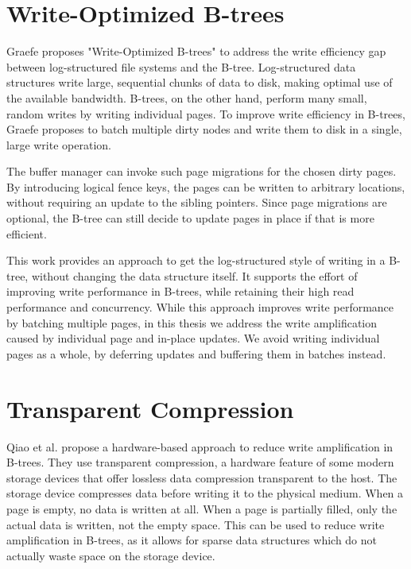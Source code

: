 \section{Write-Optimized B-trees}
Graefe proposes "Write-Optimized B-trees" \cite{graefe2004write} to address the write efficiency gap between log-structured file systems and the B-tree.
Log-structured data structures write large, sequential chunks of data to disk, making optimal use of the available bandwidth.
B-trees, on the other hand, perform many small, random writes by writing individual pages.
To improve write efficiency in B-trees, Graefe proposes to batch multiple dirty nodes and write them to disk in a single, large write operation.

The buffer manager can invoke such page migrations for the chosen dirty pages.
By introducing logical fence keys, the pages can be written to arbitrary locations, without requiring an update to the sibling pointers.
Since page migrations are optional, the B-tree can still decide to update pages in place if that is more efficient.

This work provides an approach to get the log-structured style of writing in a B-tree, without changing the data structure itself.
It supports the effort of improving write performance in B-trees, while retaining their high read performance and concurrency.
While this approach improves write performance by batching multiple pages, in this thesis we address the write amplification caused by individual page and in-place updates.
We avoid writing individual pages as a whole, by deferring updates and buffering them in batches instead.

\section{Transparent Compression}
Qiao et al. \cite{qiao2022compression} propose a hardware-based approach to reduce write amplification in B-trees.
They use transparent compression, a hardware feature of some modern storage devices that offer lossless data compression transparent to the host.
The storage device compresses data before writing it to the physical medium.
When a page is empty, no data is written at all.
When a page is partially filled, only the actual data is written, not the empty space.
This can be used to reduce write amplification in B-trees, as it allows for sparse data structures which do not actually waste space on the storage device.

